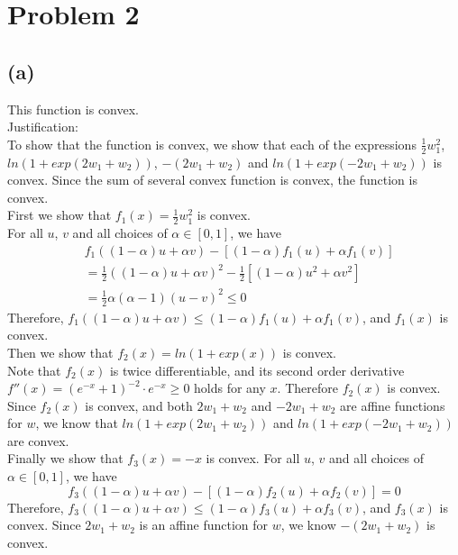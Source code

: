 \documentclass[11pt]{article}
\begin{document}
\newpage
\section*{Problem 2}
\subsection*{(a)}
This function is convex. \\

Justification: \\
To show that the function is convex, we show that each of the expressions $\frac{1}{2}w_1^2$, $ln(1+exp(2w_1+w_2))$, $-(2w_1+w_2)$ and $ln(1+exp(-2w_1+w_2))$ is convex. Since the sum of several convex function is convex, the function is convex. \\

First we show that $f_1(x) = \frac{1}{2}w_1^2$ is convex. \\
For all $u$, $v$ and all choices of $\alpha \in [0,1]$, we have 
\begin{equation}
    \begin{split}
        & f_1((1-\alpha) u + \alpha v) - [(1-\alpha) f_1(u) + \alpha f_1(v)] \\
        &= \frac{1}{2}((1-\alpha) u + \alpha v)^2 - \frac{1}{2}[(1-\alpha) u^2 + \alpha v^2] \\
        &= \frac{1}{2} \alpha (\alpha - 1) (u-v)^2
        \leq 0
    \end{split}
\end{equation}
Therefore, $f_1((1-\alpha) u + \alpha v) \leq (1-\alpha) f_1(u) + \alpha f_1(v)$, and $f_1(x)$ is convex.\\

Then we show that $f_2(x) = ln(1+exp(x))$ is convex. \\
Note that $f_2(x)$ is twice differentiable, and its second order derivative $f''(x)=(e^{-x}+1)^{-2}\cdot e^{-x} \geq 0$ holds for any $x$. Therefore $f_2(x)$ is convex. \\
Since $f_2(x)$ is convex, and both $2w_1+w_2$ and $-2w_1+w_2$ are affine functions for $w$, we know that $ln(1+exp(2w_1+w_2))$ and $ln(1+exp(-2w_1+w_2))$ are convex. \\

Finally we show that $f_3(x) = -x$ is convex. 
For all $u$, $v$ and all choices of $\alpha \in [0,1]$, we have 
\begin{equation}
        f_3((1-\alpha) u + \alpha v) - [(1-\alpha) f_2(u) + \alpha f_2(v)] = 0
\end{equation}
Therefore, $f_3((1-\alpha) u + \alpha v) \leq (1-\alpha) f_3(u) + \alpha f_3(v)$, and $f_3(x)$ is convex. Since $2w_1+w_2$ is an affine function for $w$, we know $-(2w_1+w_2)$ is convex. \\
\end{document}
